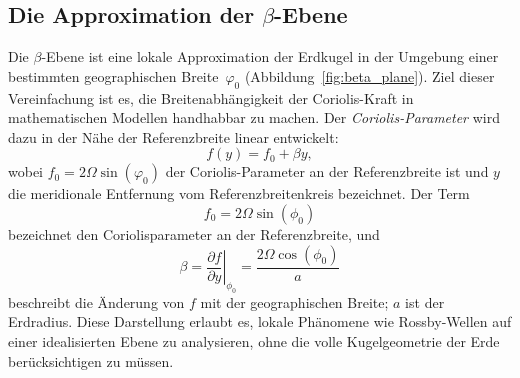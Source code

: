 \subsection{Die Approximation der \texorpdfstring{$\beta$}{β}-Ebene }

Die $\beta$-Ebene ist eine lokale Approximation der Erdkugel in der Umgebung
einer bestimmten geographischen Breite~$\varphi_0$
(Abbildung~\ref{fig:beta_plane}). Ziel dieser Vereinfachung ist es, die
Breitenabhängigkeit der Coriolis-Kraft in mathematischen Modellen handhabbar zu
machen. Der \emph{Coriolis-Parameter} wird dazu in der Nähe der Referenzbreite linear
entwickelt:
\begin{equation}
	f(y) = f_0 + \beta y,
	\label{rossby:eq:beta_plane}
\end{equation}
wobei $f_0 = 2 \Omega \sin(\varphi_0)$ der Coriolis-Parameter an der
Referenzbreite ist und $y$ die meridionale Entfernung vom
Referenzbreitenkreis bezeichnet.
Der Term
\begin{equation}
	f_0 = 2\Omega \sin(\phi_0)
	\label{rossby:eq:coriolis_parameter_ref}
\end{equation}
bezeichnet den Coriolisparameter an der Referenzbreite, und
\begin{equation}
	\beta = \left.\frac{\partial f}{\partial y}\right|_{\phi_0} = \frac{2\Omega \cos(\phi_0)}{a}
	\label{rossby:eq:beta_parameter_ref}
\end{equation}
beschreibt die Änderung von $f$ mit der geographischen Breite; $a$ ist der
Erdradius. Diese Darstellung erlaubt es, lokale Phänomene wie Rossby-Wellen auf
einer idealisierten Ebene zu analysieren, ohne die volle Kugelgeometrie der
Erde berücksichtigen zu müssen.

